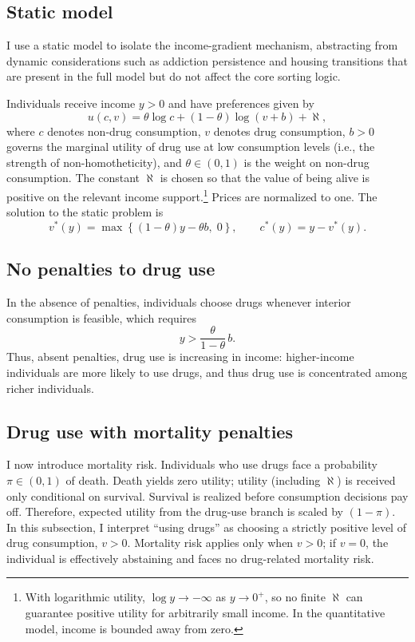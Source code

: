 \subsection{Static model}

I use a static model to isolate the income-gradient mechanism, abstracting from dynamic considerations such as addiction persistence and housing transitions that are present in the full model but do not affect the core sorting logic.

Individuals receive income $y>0$ and have preferences given by
\[
u(c,v)=\theta \log c + (1-\theta)\log(v+b) + \aleph,
\]
where $c$ denotes non-drug consumption, $v$ denotes drug consumption, $b>0$ governs the marginal utility of drug use at low consumption levels (i.e., the strength of non-homotheticity), and $\theta\in(0,1)$ is the weight on non-drug consumption. The constant $\aleph$ is chosen so that the value of being alive is positive on the relevant income support.\footnote{With logarithmic utility, $\log y\to-\infty$ as $y\to0^+$, so no finite $\aleph$ can guarantee positive utility for arbitrarily small income. In the quantitative model, income is bounded away from zero.} Prices are normalized to one. The solution to the static problem is
\[
v^{*}(y)=\max\left\{(1-\theta)y-\theta b,\;0\right\},\qquad c^{*}(y)=y-v^{*}(y).
\]

\subsection{No penalties to drug use}

In the absence of penalties, individuals choose drugs whenever interior consumption is feasible, which requires
\[
y > \frac{\theta}{1-\theta}\, b.
\]
Thus, absent penalties, drug use is increasing in income: higher-income individuals are more likely to use drugs, and thus drug use is concentrated among richer individuals.

\subsection{Drug use with mortality penalties}

I now introduce mortality risk. Individuals who use drugs face a probability $\pi\in(0,1)$ of death. Death yields zero utility; utility (including $\aleph$) is received only conditional on survival. Survival is realized before consumption decisions pay off. Therefore, expected utility from the drug-use branch is scaled by $(1-\pi)$. In this subsection, I interpret ``using drugs'' as choosing a strictly positive level of drug consumption, $v>0$. Mortality risk applies only when $v>0$; if $v=0$, the individual is effectively abstaining and faces no drug-related mortality risk.

